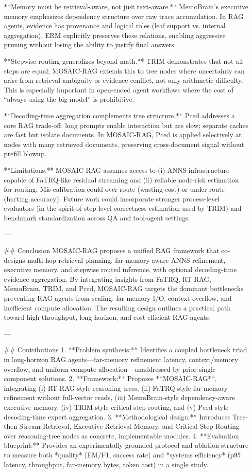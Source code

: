 **Memory must be retrieval-aware, not just text-aware.** MemoBrain’s executive memory emphasizes dependency structure over raw trace accumulation. In RAG agents, evidence has provenance and logical roles (leaf support vs. internal aggregation). ERM explicitly preserves these relations, enabling aggressive pruning without losing the ability to justify final answers.

**Stepwise routing generalizes beyond math.** TRIM demonstrates that not all steps are equal; MOSAIC-RAG extends this to tree nodes where uncertainty can arise from retrieval ambiguity or evidence conflict, not only arithmetic difficulty. This is especially important in open-ended agent workflows where the cost of “always using the big model” is prohibitive.

**Decoding-time aggregation complements tree structure.** Pced addresses a core RAG trade-off: long prompts enable interaction but are slow; separate caches are fast but isolate documents. In MOSAIC-RAG, Pced is applied selectively at nodes with many retrieved documents, preserving cross-document signal without prefill blowup.

**Limitations.** MOSAIC-RAG assumes access to (i) ANNS infrastructure capable of FaTRQ-like residual streaming and (ii) reliable node-risk estimation for routing. Mis-calibration could over-route (wasting cost) or under-route (hurting accuracy). Future work could incorporate stronger process-level evaluators (in the spirit of step-level correctness estimation used by TRIM) and benchmark standardization across QA and tool-agent settings.

---

## Conclusion  
MOSAIC-RAG proposes a unified RAG framework that co-designs multi-hop retrieval planning, far-memory-aware ANNS refinement, executive memory, and stepwise routed inference, with optional decoding-time evidence aggregation. By integrating insights from FaTRQ, RT-RAG, MemoBrain, TRIM, and Pced, MOSAIC-RAG targets the dominant bottlenecks preventing RAG agents from scaling: far-memory I/O, context overflow, and inefficient compute allocation. The resulting design outlines a practical path toward high-throughput, long-horizon, and cost-efficient RAG agents.

---

## Contributions  
1. **Problem synthesis:** Identifies a coupled bottleneck triad in long-horizon RAG agents—far-memory refinement latency, context/memory overflow, and uniform compute allocation—unaddressed by prior single-component solutions.  
2. **Framework:** Proposes **MOSAIC-RAG**, integrating (i) RT-RAG-style reasoning trees, (ii) FaTRQ-style far-memory refinement without full-vector reads, (iii) MemoBrain-style dependency-aware executive memory, (iv) TRIM-style critical-step routing, and (v) Pced-style decoding-time expert aggregation.  
3. **Methodological design:** Introduces Tree-then-Stream Retrieval, Executive Retrieval Memory, and Critical-Step Routing over reasoning-tree nodes as concrete, implementable modules.  
4. **Evaluation blueprint:** Provides an experimentally grounded protocol and ablation structure to measure both *quality* (EM/F1, success rate) and *systems efficiency* (p95 latency, throughput, far-memory bytes, token cost) in a single study.


